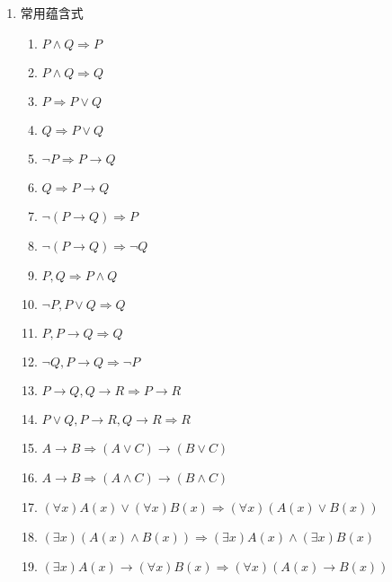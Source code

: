 \documentclass[10pt,a4paper,nofonts]{ctexart}
\begin{document}
\begin{multicols}{2}
\begin{enumerate}
\item 常用蕴含式
\begin{enumerate}[label={$I_{\arabic*}$}]
\item $P\wedge Q \Rightarrow P$
\item $P\wedge Q \Rightarrow Q$
\item $P \Rightarrow P\vee Q$
\item $Q \Rightarrow P\vee Q$
\item $\neg P \Rightarrow P\to Q$
\item $Q \Rightarrow P\to Q$
\item $\neg(P\to Q) \Rightarrow P$
\item $\neg(P\to Q) \Rightarrow \neg Q$
\item $P, Q \Rightarrow P\wedge Q$
\item $\neg P, P\vee Q \Rightarrow Q$
\item $P, P\to Q \Rightarrow Q$
\item $\neg Q, P\to Q \Rightarrow \neg P$
\item $P\to Q, Q\to R \Rightarrow P\to R$
\item $P\vee Q, P\to R, Q\to R \Rightarrow R$
\item $A\to B \Rightarrow (A\vee C)\to(B\vee C)$
\item $A\to B \Rightarrow (A\wedge C)\to(B\wedge C)$
\item $(\forall x)A(x)\vee(\forall x)B(x) \Rightarrow (\forall x)(A(x)\vee B(x))$
\item $(\exists x)(A(x)\wedge B(x)) \Rightarrow (\exists x)A(x)\wedge(\exists x)B(x)$
\item $(\exists x)A(x)\to (\forall x)B(x) \Rightarrow (\forall x)(A(x)\to B(x))$
\end{enumerate}


\end{enumerate}
\end{multicols}
\end{document}
